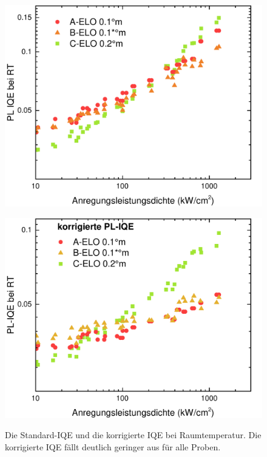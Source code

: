 \raggedright
\vspace{1cm}
%
\begin{figure}[htb]
  \centering
  \begin{minipage}[t]{0.49\textwidth}
    \centering
    \includegraphics[width=\textwidth]{Bilder/TS4045/iqeRT.pdf}
    \label{}
  \end{minipage}
	\hfill
  \begin{minipage}[t]{0.49\textwidth}
    \centering
    \includegraphics[width=\linewidth]{Bilder/TS4045/corrIQERT.pdf}
    \label{}
  \end{minipage}
	\caption{Die Standard-IQE und die korrigierte IQE bei Raumtemperatur. Die korrigierte IQE fällt deutlich geringer aus für alle Proben.}
\end{figure}
